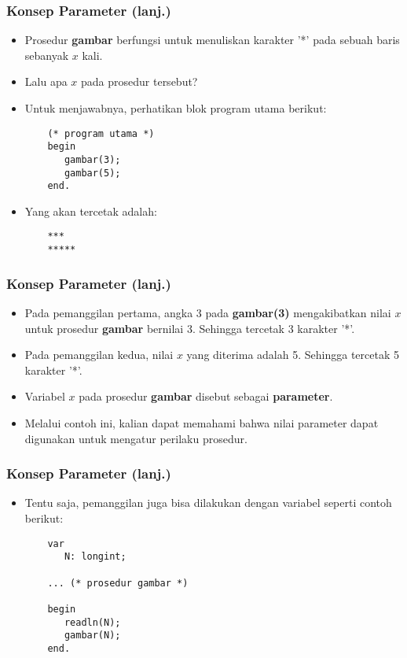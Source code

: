 \documentclass{beamer}
\begin{document}
\begin{frame}[fragile]
\frametitle{Konsep Parameter (lanj.)}
\begin{itemize}
	\item Prosedur \textbf{gambar} berfungsi untuk menuliskan karakter '*' pada sebuah baris sebanyak $x$ kali.
	\item Lalu apa $x$ pada prosedur tersebut?
	\item Untuk menjawabnya, perhatikan blok program utama berikut:
	\begin{lstlisting}
	(* program utama *)
	begin
	   gambar(3);
	   gambar(5);
	end.
	\end{lstlisting}
	\item Yang akan tercetak adalah:
	\begin{lstlisting}
	***
	*****
	\end{lstlisting}
\end{itemize}
\end{frame}

\begin{frame}[fragile]
\frametitle{Konsep Parameter (lanj.)}
\begin{itemize}
	\item Pada pemanggilan pertama, angka 3 pada \textbf{gambar(3)} mengakibatkan nilai $x$ untuk prosedur \textbf{gambar} bernilai 3. Sehingga tercetak 3 karakter '*'.
	\item Pada pemanggilan kedua, nilai $x$ yang diterima adalah 5. Sehingga tercetak 5 karakter '*'.
	\item Variabel $x$ pada prosedur \textbf{gambar} disebut sebagai \alert{\textbf{parameter}}.
	\item Melalui contoh ini, kalian dapat memahami bahwa nilai parameter dapat digunakan untuk mengatur perilaku prosedur.
\end{itemize}
\end{frame}

\begin{frame}[fragile]
\frametitle{Konsep Parameter (lanj.)}
\begin{itemize}
	\item Tentu saja, pemanggilan juga bisa dilakukan dengan variabel seperti contoh berikut:
	\begin{lstlisting}
	var
	   N: longint;
	   
	... (* prosedur gambar *)   
	   
	begin
	   readln(N);
	   gambar(N);
	end.
	\end{lstlisting}
\end{itemize}
\end{frame}
\end{document}
